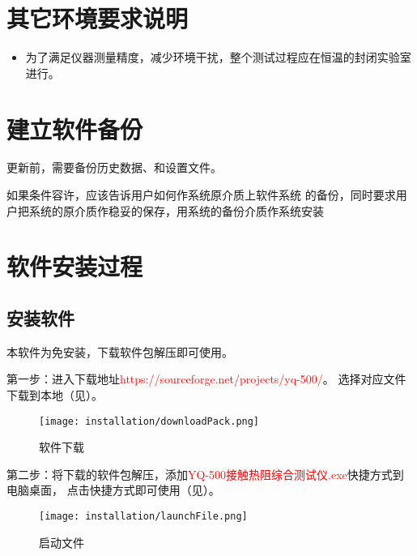 \section{其它环境要求说明}
\begin{itemize}
    \item 为了满足仪器测量精度，减少环境干扰，整个测试过程应在恒温的封闭实验室进行。
\end{itemize}

\section{建立软件备份}
更新前，需要备份历史数据、和设置文件。

如果条件容许，应该告诉用户如何作系统原介质上软件系统
的备份，同时要求用户把系统的原介质作稳妥的保存，用系统的备份介质作系统安装
\section{软件安装过程}
\subsection{安装软件\label{subsec:install}}
\par 本软件为免安装，下载软件包解压即可使用。
\par 第一步：进入下载地址\textcolor{red}{https://sourceforge.net/projects/yq-500/}。
选择对应文件下载到本地（见）。
\begin{figure}[H]
    \centering
    \texttt{[image: installation/downloadPack.png]}
    \caption{ 软件下载 \label{fig:downloadPack}}
\end{figure}
\par 第二步：将下载的软件包解压，添加\textcolor{red}{YQ-500接触热阻综合测试仪.exe}快捷方式到电脑桌面，
点击快捷方式即可使用（见）。
\begin{figure}[H]
    \centering
    \texttt{[image: installation/launchFile.png]}
    \caption{ 启动文件 \label{fig:launchFile}}
\end{figure}
